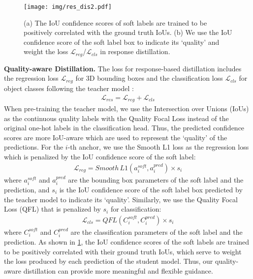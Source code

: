 \documentclass[runningheads]{llncs}
\begin{document}
\begin{figure}[t]
    \centering
    \texttt{[image: img/res\_dis2.pdf]}
    \caption{(a) The IoU confidence scores of soft labels are trained to be positively correlated with the ground truth IoUs.
    (b) We use the IoU confidence score of the soft label box to indicate its `quality' and weight the loss $\mathcal{L}_{reg}$/$\mathcal{L}_{cls}$ in response distillation.
    }
    \label{fig:response distillation}
\end{figure}

\textbf{Quality-aware Distillation.} The loss for response-based distillation includes the regression loss $\mathcal{L}_{reg}$ for 3D bounding boxes and the classification loss $\mathcal{L}_{cls}$ for object classes following the teacher model \cite{second}:
\begin{align}
    \mathcal{L}_{res} = \mathcal{L}_{reg} + \mathcal{L}_{cls} 
\end{align}
When pre-training the teacher model, we use the Intersection over Unions (IoUs) as the continuous quality labels with the Quality Focal Loss \cite{gfl} instead of the original one-hot labels in the classification head.
Thus, the predicted confidence scores are more IoU-aware which are used to represent the `quality' of the predictions.
For the $i$-th anchor, we use the Smooth L1 loss as the regression loss which is penalized by the IoU confidence score of the soft label:
\begin{align}
    \mathcal{L}_{reg} = Smooth\,L1(a^{soft}_i, a^{pred}_i)\times s_i         
\end{align}
where $a^{soft}_i$ and $a^{pred}_i$ are the bounding box parameters of the soft label and the prediction, and $s_i$ is the IoU confidence score of the soft label box predicted by the teacher model to indicate its `quality'. 
Similarly, we use the Quality Focal Loss (QFL) \cite{gfl} that is penalized by $s_i$ for classification:
\begin{align}
    \mathcal{L}_{cls} = QFL(C^{soft}_i, C^{pred}_i)\times s_i
\end{align}
where $C^{soft}_i$ and $C^{pred}_i$ are the classification parameters of the soft label and the prediction.
As shown in \cref{fig:response distillation}, the IoU confidence scores of the soft labels are trained to be positively correlated with their ground truth IoUs, which serve to weight the loss produced by each prediction of the student model.
Thus, our quality-aware distillation can provide more meaningful and flexible guidance.
\end{document}
